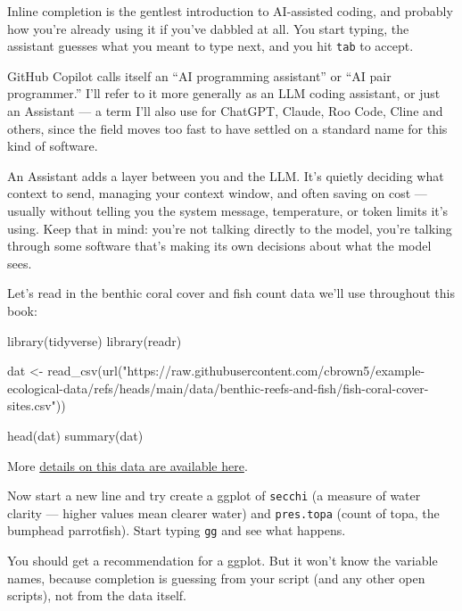 \documentclass[
  letterpaper,
  DIV=11,
  numbers=noendperiod]{scrreprt}
\newenvironment{Shaded}{\begin{snugshade}}{\end{snugshade}}
\newcommand{\FunctionTok}[1]{\textcolor[rgb]{0.28,0.35,0.67}{#1}}
\newcommand{\NormalTok}[1]{\textcolor[rgb]{0.00,0.23,0.31}{#1}}
\newcommand{\OtherTok}[1]{\textcolor[rgb]{0.00,0.23,0.31}{#1}}
\newcommand{\StringTok}[1]{\textcolor[rgb]{0.13,0.47,0.30}{#1}}
\begin{document}
Inline completion is the gentlest introduction to AI-assisted coding,
and probably how you're already using it if you've dabbled at all. You
start typing, the assistant guesses what you meant to type next, and you
hit \texttt{tab} to accept.

GitHub Copilot calls itself an ``AI programming assistant'' or ``AI pair
programmer.'' I'll refer to it more generally as an LLM coding
assistant, or just an Assistant --- a term I'll also use for ChatGPT,
Claude, Roo Code, Cline and others, since the field moves too fast to
have settled on a standard name for this kind of software.

An Assistant adds a layer between you and the LLM. It's quietly deciding
what context to send, managing your context window, and often saving on
cost --- usually without telling you the system message, temperature, or
token limits it's using. Keep that in mind: you're not talking directly
to the model, you're talking through some software that's making its own
decisions about what the model sees.

Let's read in the benthic coral cover and fish count data we'll use
throughout this book:

\begin{Shaded}
\begin{Highlighting}[]
\FunctionTok{library}\NormalTok{(tidyverse)}
\FunctionTok{library}\NormalTok{(readr)}

\NormalTok{dat }\OtherTok{\textless{}{-}} \FunctionTok{read\_csv}\NormalTok{(}\FunctionTok{url}\NormalTok{(}\StringTok{"https://raw.githubusercontent.com/cbrown5/example{-}ecological{-}data/refs/heads/main/data/benthic{-}reefs{-}and{-}fish/fish{-}coral{-}cover{-}sites.csv"}\NormalTok{))}

\FunctionTok{head}\NormalTok{(dat)}
\FunctionTok{summary}\NormalTok{(dat)}
\end{Highlighting}
\end{Shaded}

More
\href{https://github.com/cbrown5/example-ecological-data/blob/main/data/benthic-reefs-and-fish/readme.md}{details
on this data are available here}.

Now start a new line and try create a ggplot of \texttt{secchi} (a
measure of water clarity --- higher values mean clearer water) and
\texttt{pres.topa} (count of topa, the bumphead parrotfish). Start
typing \texttt{gg} and see what happens.

You should get a recommendation for a ggplot. But it won't know the
variable names, because completion is guessing from your script (and any
other open scripts), not from the data itself.
\end{document}

